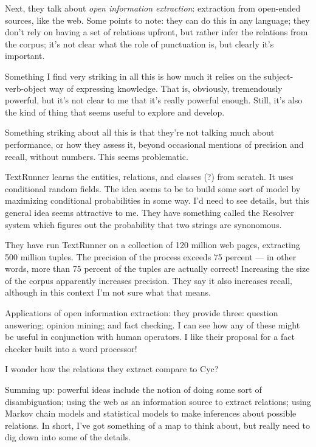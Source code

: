 Next, they talk about \emph{open information extraction}: extraction
from open-ended sources, like the web.  Some points to note: they can
do this in any language; they don't rely on having a set of relations
upfront, but rather infer the relations from the corpus; it's not
clear what the role of punctuation is, but clearly it's important.

Something I find very striking in all this is how much it relies on
the subject-verb-object way of expressing knowledge.  That is,
obviously, tremendously powerful, but it's not clear to me that it's
really powerful enough.  Still, it's also the kind of thing that seems
useful to explore and develop.

Something striking about all this is that they're not talking much
about performance, or how they assess it, beyond occasional mentions
of precision and recall, without numbers.  This seems problematic.

TextRunner learns the entities, relations, and classes (?) from
scratch.  It uses conditional random fields.  The idea seems to be to
build some sort of model by maximizing conditional probabilities in
some way.  I'd need to see details, but this general idea seems
attractive to me.  They have something called the Resolver system
which figures out the probability that two strings are synonomous.

They have run TextRunner on a collection of 120 million web pages,
extracting 500 million tuples.  The precision of the process exceeds
75 percent --- in other words, more than 75 percent of the tuples are
actually correct!  Increasing the size of the corpus apparently
increases precision.  They say it also increases recall, although in
this context I'm not sure what that means.

Applications of open information extraction: they provide three:
question answering; opinion mining; and fact checking.  I can see how
any of these might be useful in conjunction with human operators.  I
like their proposal for a fact checker built into a word processor!

I wonder how the relations they extract compare to Cyc?

Summing up: powerful ideas include the notion of doing some sort of
disambiguation; using the web as an information source to extract
relations; using Markov chain models and statistical models to make
inferences about possible relations.  In short, I've got something of
a map to think about, but really need to dig down into some of the
details.

